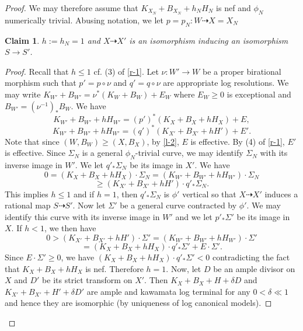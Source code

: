 \documentclass[12pt]{amsart}
\theoremstyle{plain}
\newtheorem{claim}[theorem]{Claim}
\begin{document}
\begin{proof}
We may therefore assume that $K_{X_N}+B_{X_N}+h_NH_N$ is nef and
$\phi _N$ numerically trivial. Abusing notation, we let $p=p_N:W\dasharrow 
X=X_N$
\begin{claim} $h:=h_N= 1$ and $X\dasharrow X'$ is an isomorphism inducing
 an isomorphism $S\to S'$.
\end{claim}
\begin{proof} Recall that $h\leq 1$ cf. (3) of \eqref{r-1}. Let $\nu:W'\to W$ be a proper birational morphism such that
$p'=p\circ \nu$ and $q'=q\circ \nu$ are appropriate log resolutions.
We may write $K_{W'}+B_{W'}=\nu ^* (K_W+B_W)+E_W$ where 
$E_W\geq 0$ is exceptional and $B_{W'}=(\nu ^{-1})_*B_W$.
We have
$$K_{W'}+B_{W'}+hH_{W'}=(p')^*(K_{X}+B_X+hH_X)+E,$$
$$K_{W'}+B_{W'}+hH_{W'}=(q')^*(K_{X'}+B_{X'}+hH')+E'.$$
Note that since $(W,B_W)\geq (X,B_X)$, by \eqref{l-2}, $E$ is effective.
By (4) of \eqref{r-1}, $E'$ is effective. 
Since $\Sigma _N$ is a general $\phi _N$-trivial curve, 
we may identify $\Sigma _N$ with
its inverse image in $W'$. We let $q'_*\Sigma  _N$ be its image in $X'$.
We have $$0=(K_{X}+B_X+hH_X)\cdot \Sigma _N=(K_{W'}+B_{W'}+hH_{W'})\cdot \Sigma_N
$$ $$\geq(K_{X'}+B_{X'}+hH')\cdot q'_*\Sigma _N.$$
This implies $h\leq 1$ and if $h=1$, then $q'_*\Sigma _N$ is $\phi '$ vertical
so that $X\dasharrow X'$ induces a rational map $S\dasharrow S'$.
Now let $\Sigma '$ be a general curve contracted by $\phi '$. 
We may identify this curve with its inverse image in $W'$ and we let 
$p'_*\Sigma'$ be its image in $X$. If $h<1$, we then have $$0>(K_{X'}+B_{X'}+hH')\cdot \Sigma '=
(K_{W'}+B_{W'}+hH_{W'})\cdot \Sigma '$$
$$=(K_{X}+B_X+hH_X)\cdot q'_*\Sigma'+E\cdot \Sigma'.$$
Since $E\cdot \Sigma'\geq 0$, we have $(K_{X}+B_X+hH_X)\cdot q'_*\Sigma'<0$ contradicting the fact that $K_{X}+B_X+hH_X$ is nef.
Therefore $h=1$. Now, let $D$ be an ample divisor on $X$ and $D'$ be its strict transform on $X'$. Then $K_X+B_X+H+\delta D$ and $K_{X'}+B_{X'}+H'+\delta D'$
are ample and kawamata log terminal for any $0<\delta \ll 1$ and hence 
they are isomorphic (by uniqueness of log canonical models).
\end{proof}
\end{proof}
\end{document}

